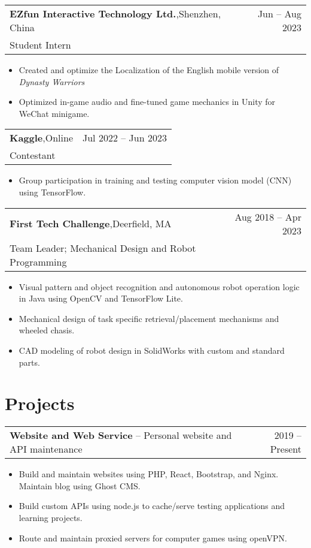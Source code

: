 \documentclass[oneside, 11pt]{article}
\newcommand*{\experienceEntry}[4]{
	\noindent
	\begin{tabularx}{\textwidth}{Xr}
	\textbf{#1},\quad #2 & #3\\
	#4
	\end{tabularx}
	\vspace{-0.75\baselineskip}
}
\newcommand*{\projectEntry}[3]{
	\noindent
	\begin{tabularx}{\textwidth}{Xr}
	\textbf{#1} -- #3 & #2
	\end{tabularx}
	\vspace{-1.25\baselineskip}
}
\newenvironment{expD}
	{\begin{itemize}[noitemsep,topsep=0pt]}
	{\end{itemize}}
\begin{document}
\experienceEntry{EZfun Interactive Technology Ltd.}
	{Shenzhen, China}
	{Jun -- Aug 2023}
	{Student Intern}

\begin{expD}
	\item Created and optimize the Localization of the English mobile version of \textit{Dynasty Warriors}
	\item Optimized in-game audio and fine-tuned game mechanics in Unity for WeChat minigame.
\end{expD}

\experienceEntry{Kaggle}
	{Online}
	{Jul 2022 -- Jun 2023}
	{Contestant}

\begin{expD}
	\item Group participation in training and testing computer vision model (CNN) using TensorFlow.
\end{expD}

\experienceEntry{First Tech Challenge}
	{Deerfield, MA}
	{Aug 2018 -- Apr 2023}
	{Team Leader; Mechanical Design and Robot Programming}

\begin{expD}
	\item Visual pattern and object recognition and autonomous robot operation logic in Java using OpenCV and TensorFlow Lite.
	\item Mechanical design of task specific retrieval/placement mechanisms and wheeled chasis.
	\item CAD modeling of robot design in SolidWorks with custom and standard parts.
\end{expD}

\section*{Projects}

\projectEntry{Website and Web Service}
	{2019 -- Present}
	{Personal website and API maintenance}

\begin{expD}
	\item Build and maintain websites using PHP, React, Bootstrap, and Nginx. Maintain blog using Ghost CMS.
	\item Build custom APIs using node.js to cache/serve testing applications and learning projects.
	\item Route and maintain proxied servers for computer games using openVPN.
\end{expD}
\end{document}
